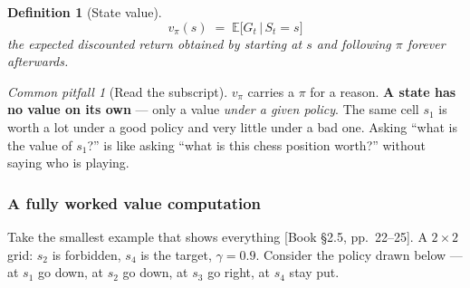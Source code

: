 \documentclass[11pt, letterpaper]{article}
\theoremstyle{runin}
\newtheorem*{definition}{Definition}
\theoremstyle{runinplain}
\theoremstyle{remark}
\newtheorem*{warning}{Common pitfall}
\newcommand{\E}{\mathbb{E}}
\newcommand{\bkin}[1]{{\color{bookblue}\small[\textsf{Book #1}]}}
\begin{document}
\begin{definition}[State value]
\[
  \boxed{\;v_\pi(s)\;=\;\E\bigl[G_t \,\big|\, S_t=s\bigr]\;}
\]
the expected discounted return obtained by \emph{starting at $s$ and following $\pi$
forever afterwards}.
\end{definition}

\begin{warning}[Read the subscript]
$v_\pi$ carries a $\pi$ for a reason. \textbf{A state has no value on its own} ---
only a value \emph{under a given policy}. The same cell $s_1$ is worth a lot under a
good policy and very little under a bad one. Asking ``what is the value of $s_1$?''
is like asking ``what is this chess position worth?'' without saying who is playing.
\end{warning}

\subsubsection*{A fully worked value computation}

Take the smallest example that shows everything \bkin{\S2.5, pp.~22--25}. A
$2\times2$ grid: $s_2$ is forbidden, $s_4$ is the target, $\gamma=0.9$. Consider the
policy drawn below --- at $s_1$ go down, at $s_2$ go down, at $s_3$ go right, at $s_4$
stay put.

\begin{center}
\end{center}
\end{document}
